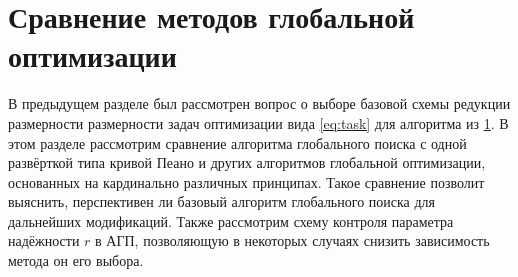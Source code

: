 \section{Сравнение методов глобальной оптимизации}

В предыдущем разделе был рассмотрен вопрос о выборе базовой схемы редукции размерности размерности задач оптимизации вида \ref{eq:task} для
алгоритма из \ref{}. В этом разделе рассмотрим сравнение алгоритма глобального поиска с одной развёрткой типа кривой Пеано
и других алгоритмов глобальной оптимизации, основанных на кардинально различных принципах. Такое сравнение позволит
выяснить, перспективен ли базовый алгоритм глобального поиска для дальнейших модификаций. Также рассмотрим схему контроля
параметра надёжности \(r\) в АГП, позволяющую в некоторых случаях снизить зависимость метода он его выбора.


